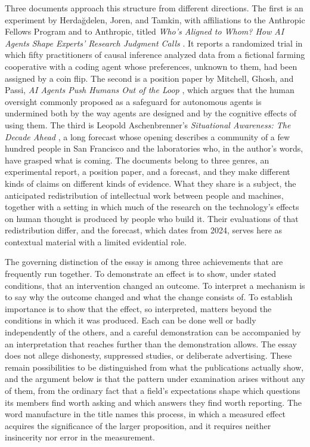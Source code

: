 \documentclass[11pt]{article}
\begin{document}
Three documents approach this structure from different directions. The first is an experiment by Herdağdelen, Joren, and Tamkin, with affiliations to the Anthropic Fellows Program and to Anthropic, titled \emph{Who's Aligned to Whom? How AI Agents Shape Experts' Research Judgment Calls} \cite{herdagdelen}. It reports a randomized trial in which fifty practitioners of causal inference analyzed data from a fictional farming cooperative with a coding agent whose preferences, unknown to them, had been assigned by a coin flip. The second is a position paper by Mitchell, Ghosh, and Passi, \emph{AI Agents Push Humans Out of the Loop} \cite{mitchell}, which argues that the human oversight commonly proposed as a safeguard for autonomous agents is undermined both by the way agents are designed and by the cognitive effects of using them. The third is Leopold Aschenbrenner's \emph{Situational Awareness: The Decade Ahead} \cite{aschenbrenner}, a long forecast whose opening describes a community of a few hundred people in San Francisco and the laboratories who, in the author's words, have grasped what is coming. The documents belong to three genres, an experimental report, a position paper, and a forecast, and they make different kinds of claims on different kinds of evidence. What they share is a subject, the anticipated redistribution of intellectual work between people and machines, together with a setting in which much of the research on the technology's effects on human thought is produced by people who build it. Their evaluations of that redistribution differ, and the forecast, which dates from 2024, serves here as contextual material with a limited evidential role.

The governing distinction of the essay is among three achievements that are frequently run together. To demonstrate an effect is to show, under stated conditions, that an intervention changed an outcome. To interpret a mechanism is to say why the outcome changed and what the change consists of. To establish importance is to show that the effect, so interpreted, matters beyond the conditions in which it was produced. Each can be done well or badly independently of the others, and a careful demonstration can be accompanied by an interpretation that reaches further than the demonstration allows. The essay does not allege dishonesty, suppressed studies, or deliberate advertising. These remain possibilities to be distinguished from what the publications actually show, and the argument below is that the pattern under examination arises without any of them, from the ordinary fact that a field's expectations shape which questions its members find worth asking and which answers they find worth reporting. The word manufacture in the title names this process, in which a measured effect acquires the significance of the larger proposition, and it requires neither insincerity nor error in the measurement.
\end{document}
